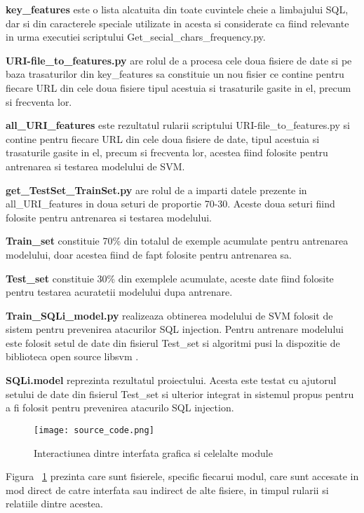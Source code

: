 \textbf{key\_features} este o lista alcatuita din toate cuvintele cheie a limbajului SQL, dar si din caracterele speciale utilizate in acesta si considerate ca fiind relevante in urma executiei scriptului Get\_secial\_chars\_frequency.py.

\textbf{URI-file\_to\_features.py} are rolul de a procesa cele doua fisiere de date si pe baza trasaturilor din key\_features sa constituie un nou fisier ce contine pentru fiecare URL din cele doua fisiere tipul acestuia si trasaturile gasite in el, precum si frecventa lor.

\textbf{all\_URI\_features} este rezultatul rularii scriptului URI-file\_to\_features.py si contine pentru fiecare URL din cele doua fisiere de date, tipul acestuia si trasaturile gasite in el, precum si frecventa lor, acestea fiind folosite pentru antrenarea si testarea modelului de SVM.

\textbf{get\_TestSet\_TrainSet.py} are rolul de a 
imparti datele prezente in all\_URI\_features in doua seturi de proportie 70-30. Aceste doua seturi fiind folosite pentru antrenarea si testarea modelului.

\textbf{Train\_set} constituie 70\% din totalul de exemple acumulate pentru antrenarea modelului, doar acestea fiind de fapt folosite pentru antrenarea sa.

\textbf{Test\_set} constituie 30\% din exemplele acumulate, aceste date fiind folosite pentru testarea acuratetii modelului dupa antrenare.

\textbf{Train\_SQLi\_model.py} realizeaza obtinerea modelului de SVM folosit de sistem pentru prevenirea atacurilor SQL injection. Pentru antrenare modelului este folosit setul de date din fisierul Test\_set si algoritmi pusi la dispozitie de biblioteca open source libsvm \cite{libsvm}.

\textbf{SQLi.model} reprezinta rezultatul proiectului. Acesta este testat cu ajutorul setului de date din fisierul Test\_set si ulterior integrat in sistemul propus pentru a fi folosit pentru prevenirea atacurilo SQL injection.

\newpage

\begin{figure}[h]
	\centering
	\texttt{[image: source\_code.png]}
	\caption{Interactiunea dintre interfata grafica si celelalte module}
	\label{fig:source_code}
\end{figure}
Figura ~\ref{fig:source_code} prezinta care sunt fisierele, specific fiecarui modul, care sunt accesate in mod direct de catre interfata sau indirect de alte fisiere, in timpul rularii si relatiile dintre acestea. \\



